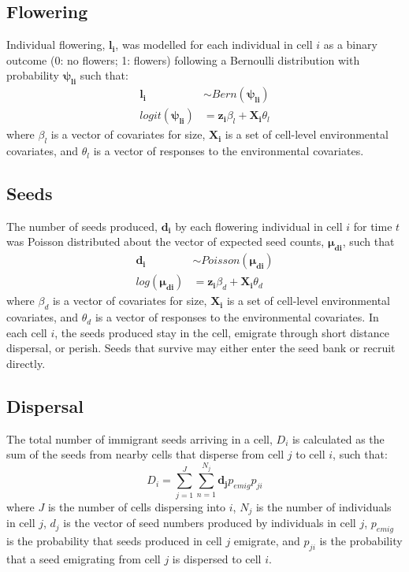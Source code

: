 \documentclass[]{article}
\begin{document}
\subsection{Flowering}

Individual flowering, \(\boldsymbol{l_i}\), was modelled for each
individual in cell \(i\) as a binary outcome (0: no flowers; 1: flowers)
following a Bernoulli distribution with probability
\(\boldsymbol{\psi_{li}}\) such that: \begin{align}
\boldsymbol{l_i} &\sim Bern(\boldsymbol{\psi_{li}}) \\
logit(\boldsymbol{\psi_{li}}) &= \boldsymbol{z_i}\beta_{l} + \boldsymbol{X_i}\theta_{l}
\end{align} where \(\beta_{l}\) is a vector of covariates for size,
\(\boldsymbol{X_i}\) is a set of cell-level environmental covariates,
and \(\theta_{l}\) is a vector of responses to the environmental
covariates.

\subsection{Seeds}

The number of seeds produced, \(\boldsymbol{d_i}\) by each flowering
individual in cell \(i\) for time \(t\) was Poisson distributed about
the vector of expected seed counts, \(\boldsymbol{\mu_{di}}\), such that
\begin{align}
\boldsymbol{d_i} &\sim Poisson(\boldsymbol{\mu_{di}}) \\
log(\boldsymbol{\mu_{di}}) &= \boldsymbol{z_i}\beta_{d} + \boldsymbol{X_i}\theta_{d}
\end{align} where \(\beta_{d}\) is a vector of covariates for size,
\(\boldsymbol{X_i}\) is a set of cell-level environmental covariates,
and \(\theta_{d}\) is a vector of responses to the environmental
covariates. In each cell \(i\), the seeds produced stay in the cell,
emigrate through short distance dispersal, or perish. Seeds that survive
may either enter the seed bank or recruit directly.

\subsection{Dispersal}

The total number of immigrant seeds arriving in a cell, \(D_i\) is
calculated as the sum of the seeds from nearby cells that disperse from
cell \(j\) to cell \(i\), such that: \begin{equation}
D_i = \sum\limits_{j=1}^J \sum\limits_{n=1}^{N_j} \boldsymbol{d_j}p_{emig}p_{ji}
\end{equation} where \(J\) is the number of cells dispersing into \(i\),
\(N_j\) is the number of individuals in cell \(j\), \(d_j\) is the
vector of seed numbers produced by individuals in cell \(j\),
\(p_{emig}\) is the probability that seeds produced in cell \(j\)
emigrate, and \(p_{ji}\) is the probability that a seed emigrating from
cell \(j\) is dispersed to cell \(i\).
\end{document}
